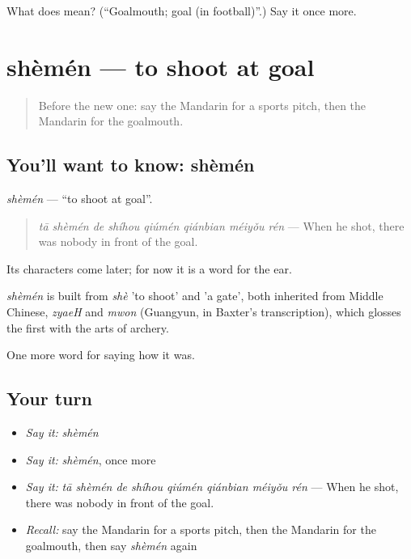 \begin{tcolorbox}[breakable,colback=teal!4,colframe=teal!35!black,title={Before you move on}]
What does  mean? (\textquotedblleft{}Goalmouth; goal (in football)\textquotedblright{}.) Say it once more.
\end{tcolorbox}
\section[shèmén]{shèmén — to shoot at goal}

\label{lesson:ZH-C498-shemen}



\begin{quote}
Before the new one: say the Mandarin for a sports pitch, then the Mandarin for the goalmouth.
\end{quote}

\subsection*{You'll want to know: shèmén}
\emph{shèmén} — \textquotedblleft{}to shoot at goal\textquotedblright{}.

\begin{quote}
\emph{tā shèmén de shíhou qiúmén qiánbian méiyǒu rén} — When he shot, there was nobody in front of the goal.
\end{quote}

Its characters come later; for now it is a word for the ear.

\begin{cousinweb}
\emph{shèmén} is built from \emph{shè} 'to shoot' and  'a gate', both inherited from Middle Chinese, \emph{zyaeH} and \emph{mwon} (Guangyun, in Baxter's transcription), which glosses the first with the arts of archery.
\end{cousinweb}

\begin{grammarlens}[title={What you've built}]
One more word for saying how it was.
\end{grammarlens}

\subsection*{Your turn}
\begin{itemize}
\raggedright
  \item \emph{Say it:} \emph{shèmén}
  \item \emph{Say it:} \emph{shèmén}, once more
  \item \emph{Say it:} \emph{tā shèmén de shíhou qiúmén qiánbian méiyǒu rén} — When he shot, there was nobody in front of the goal.
  \item \emph{Recall:} say the Mandarin for a sports pitch, then the Mandarin for the goalmouth, then say \emph{shèmén} again
\end{itemize}

